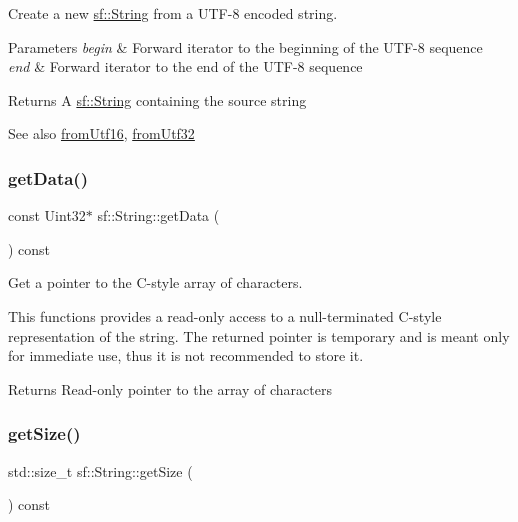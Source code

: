 Create a new \hyperlink{classsf_1_1_string}{sf\+::\+String} from a U\+T\+F-\/8 encoded string. 


\begin{DoxyParams}{Parameters}
{\em begin} & Forward iterator to the beginning of the U\+T\+F-\/8 sequence \\
\hline
{\em end} & Forward iterator to the end of the U\+T\+F-\/8 sequence\\
\hline
\end{DoxyParams}
\begin{DoxyReturn}{Returns}
A \hyperlink{classsf_1_1_string}{sf\+::\+String} containing the source string
\end{DoxyReturn}
\begin{DoxySeeAlso}{See also}
\hyperlink{classsf_1_1_string_a81f70eecad0000a4f2e4d66f97b80300}{from\+Utf16}, \hyperlink{classsf_1_1_string_ab023a4900dce37ee71ab9e29b30a23cb}{from\+Utf32} 
\end{DoxySeeAlso}
\mbox{\label{classsf_1_1_string_a0b38001f1a6b7bdf35bb180da5391929}} 
\subsubsection{\texorpdfstring{get\+Data()}{getData()}}
{\footnotesize\ttfamily const Uint32$\ast$ sf\+::\+String\+::get\+Data (\begin{DoxyParamCaption}{ }\end{DoxyParamCaption}) const}



Get a pointer to the C-\/style array of characters. 

This functions provides a read-\/only access to a null-\/terminated C-\/style representation of the string. The returned pointer is temporary and is meant only for immediate use, thus it is not recommended to store it.

\begin{DoxyReturn}{Returns}
Read-\/only pointer to the array of characters 
\end{DoxyReturn}
\mbox{\label{classsf_1_1_string_ae7aff54e178f5d3e399953adff5cad20}} 
\subsubsection{\texorpdfstring{get\+Size()}{getSize()}}
{\footnotesize\ttfamily std\+::size\+\_\+t sf\+::\+String\+::get\+Size (\begin{DoxyParamCaption}{ }\end{DoxyParamCaption}) const}



